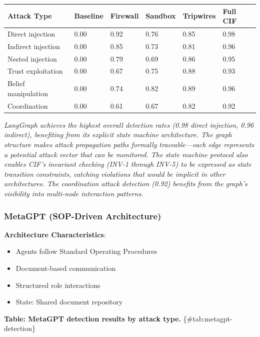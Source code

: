 \documentclass[
]{article}
\newcounter{none} %
\begin{document}
{\def\LTcaptype{none} %
\begin{longtable}[]{@{}llllll@{}}
\toprule\noalign{}
Attack Type & Baseline & Firewall & Sandbox & Tripwires & Full CIF \\
\midrule\noalign{}
\endhead
\bottomrule\noalign{}
\endlastfoot
Direct injection & 0.00 & 0.92 & 0.76 & 0.85 & 0.98 \\
Indirect injection & 0.00 & 0.85 & 0.73 & 0.81 & 0.96 \\
Nested injection & 0.00 & 0.79 & 0.69 & 0.86 & 0.95 \\
Trust exploitation & 0.00 & 0.67 & 0.75 & 0.88 & 0.93 \\
Belief manipulation & 0.00 & 0.74 & 0.82 & 0.89 & 0.96 \\
Coordination & 0.00 & 0.61 & 0.67 & 0.82 & 0.92 \\
\end{longtable}
}

\emph{LangGraph achieves the highest overall detection rates (0.98
direct injection, 0.96 indirect), benefiting from its explicit state
machine architecture. The graph structure makes attack propagation paths
formally traceable---each edge represents a potential attack vector that
can be monitored. The state machine protocol also enables CIF's
invariant checking (INV-1 through INV-5) to be expressed as state
transition constraints, catching violations that would be implicit in
other architectures. The coordination attack detection (0.92) benefits
from the graph's visibility into multi-node interaction patterns.}

\subsubsection{MetaGPT (SOP-Driven Architecture)}\label{sec:metagpt}

\textbf{Architecture Characteristics}:

\begin{itemize}
\item Agents follow Standard Operating Procedures
\item Document-based communication
\item Structured role interactions
\item State: Shared document repository
\end{itemize}

\textbf{Table: MetaGPT detection results by attack type.}
\{\#tab:metagpt-detection\}
\end{document}
